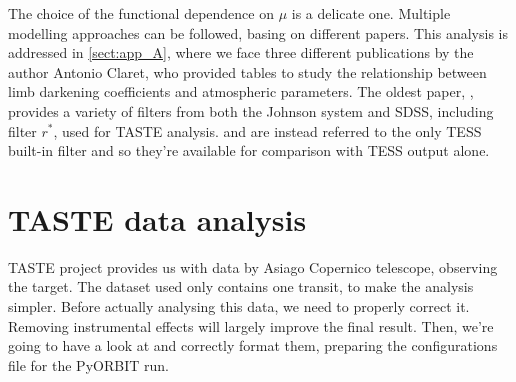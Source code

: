 \documentclass[a4paper,11pt,twocolumn]{article}
\begin{document}
The choice of the functional dependence on
$\mu$ is a delicate one. Multiple modelling approaches can
be followed, basing on different papers. This
analysis is addressed in \ref{sect:app_A}, 
where we face three different publications 
by the author Antonio Claret, who provided 
tables to study the relationship between limb 
darkening coefficients and atmospheric 
parameters. The oldest paper, \cite{claret2011},
provides a variety of filters from both the Johnson 
system and SDSS, including filter $r^*$, used for TASTE analysis. 
\cite{claret2017} and \cite{claret2018}
are instead referred to the only TESS built-in filter and 
so they're available for comparison with TESS output alone.


\section{TASTE data analysis}

TASTE project provides us with data by Asiago Copernico telescope, observing the target. 
The dataset used only contains one transit, to make the analysis simpler.
Before actually analysing this data, we need to properly correct it. Removing 
instrumental effects will largely improve the final result.
Then, we're going to have a look at and correctly format them, preparing 
the configurations file for the PyORBIT run. 
\end{document}
